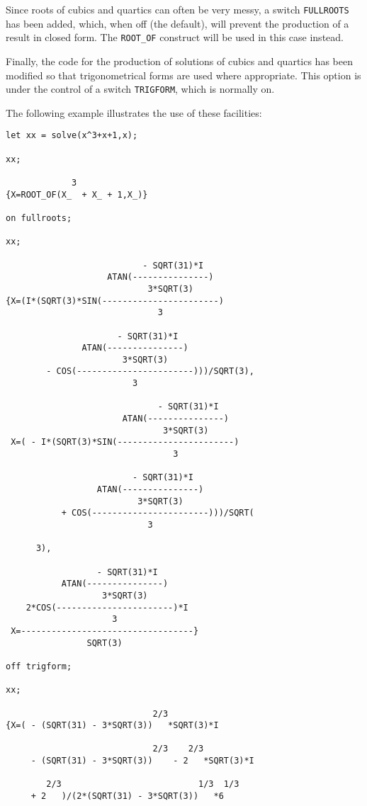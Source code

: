 Since roots of cubics and quartics can often be very messy, a switch
{\tt FULLROOTS} has been added, which, when off (the default), will
prevent the production of a result in closed form.  The {\tt ROOT\_OF}
construct will be used in this case instead.

Finally, the code for the production of solutions of cubics and quartics
has been modified so that trigonometrical forms are used where appropriate.
This option is under the control of a switch {\tt TRIGFORM}, which is
normally on.

The following example illustrates the use of these facilities:
\begin{verbatim}
let xx = solve(x^3+x+1,x);

xx;

             3
{X=ROOT_OF(X_  + X_ + 1,X_)}

on fullroots;

xx;

                           - SQRT(31)*I
                    ATAN(---------------)
                            3*SQRT(3)
{X=(I*(SQRT(3)*SIN(-----------------------)
                              3

                      - SQRT(31)*I
               ATAN(---------------)
                       3*SQRT(3)
        - COS(-----------------------)))/SQRT(3),
                         3

                              - SQRT(31)*I
                       ATAN(---------------)
                               3*SQRT(3)
 X=( - I*(SQRT(3)*SIN(-----------------------)
                                 3

                         - SQRT(31)*I
                  ATAN(---------------)
                          3*SQRT(3)
           + COS(-----------------------)))/SQRT(
                            3

      3),

                  - SQRT(31)*I
           ATAN(---------------)
                   3*SQRT(3)
    2*COS(-----------------------)*I
                     3
 X=----------------------------------}
                SQRT(3)

off trigform;

xx;

                             2/3
{X=( - (SQRT(31) - 3*SQRT(3))   *SQRT(3)*I

                             2/3    2/3
     - (SQRT(31) - 3*SQRT(3))    - 2   *SQRT(3)*I

        2/3                           1/3  1/3
     + 2   )/(2*(SQRT(31) - 3*SQRT(3))   *6


\end{verbatim}
